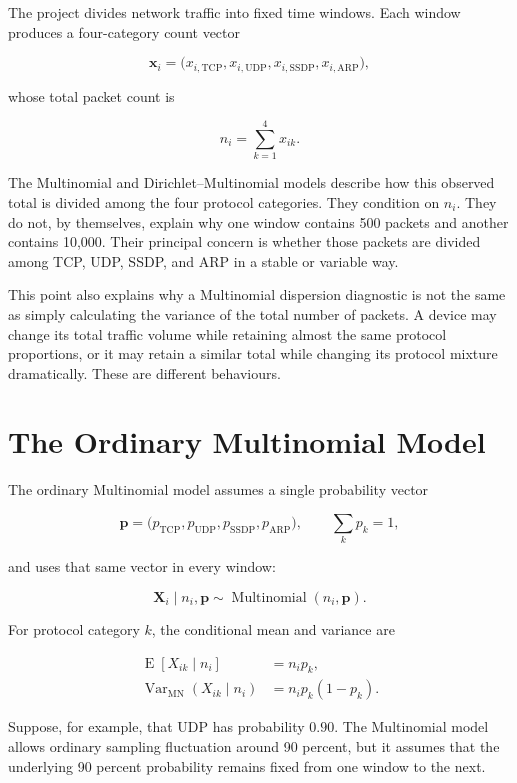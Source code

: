 \documentclass[11pt,a4paper]{article}
\begin{document}
The project divides network traffic into fixed time windows.  Each window
produces a four-category count vector

\[
\mathbf{x}_i=
\bigl(
x_{i,\mathrm{TCP}},
x_{i,\mathrm{UDP}},
x_{i,\mathrm{SSDP}},
x_{i,\mathrm{ARP}}
\bigr),
\]

whose total packet count is

\[
n_i=\sum_{k=1}^{4}x_{ik}.
\]

The Multinomial and Dirichlet--Multinomial models describe how this observed
total is divided among the four protocol categories.  They condition on
$n_i$.  They do not, by themselves, explain why one window contains 500
packets and another contains 10,000.  Their principal concern is whether those
packets are divided among TCP, UDP, SSDP, and ARP in a stable or variable way.

This point also explains why a Multinomial dispersion diagnostic is not the
same as simply calculating the variance of the total number of packets.  A
device may change its total traffic volume while retaining almost the same
protocol proportions, or it may retain a similar total while changing its
protocol mixture dramatically.  These are different behaviours.

\section{The Ordinary Multinomial Model}

The ordinary Multinomial model assumes a single probability vector

\[
\mathbf{p}=
\bigl(
p_{\mathrm{TCP}},
p_{\mathrm{UDP}},
p_{\mathrm{SSDP}},
p_{\mathrm{ARP}}
\bigr),
\qquad
\sum_k p_k=1,
\]

and uses that same vector in every window:

\[
\mathbf{X}_i\mid n_i,\mathbf{p}
\sim \operatorname{Multinomial}(n_i,\mathbf{p}).
\]

For protocol category $k$, the conditional mean and variance are

\begin{align}
\operatorname{E}[X_{ik}\mid n_i]
  &=n_i p_k,\\
\operatorname{Var}_{\mathrm{MN}}(X_{ik}\mid n_i)
  &=n_i p_k(1-p_k).
\end{align}

Suppose, for example, that UDP has probability $0.90$.  The Multinomial model
allows ordinary sampling fluctuation around 90 percent, but it assumes that
the underlying 90 percent probability remains fixed from one window to the
next.
\end{document}
